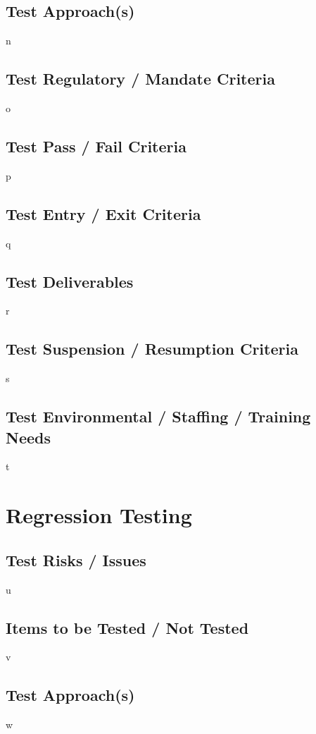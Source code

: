 \documentclass{article}
\begin{document}
\subsection{Test Approach(s)}
n

\subsection{Test Regulatory / Mandate Criteria}
o

\subsection{Test Pass / Fail Criteria}
p

\subsection{Test Entry / Exit Criteria}
q

\subsection{Test Deliverables}
r

\subsection{Test Suspension / Resumption Criteria}
s

\subsection{Test Environmental / Staffing / Training Needs}
t

\section{Regression Testing}
\subsection{Test Risks / Issues}
u

\subsection{Items to be Tested / Not Tested}
v

\subsection{Test Approach(s)}
w
\end{document}
